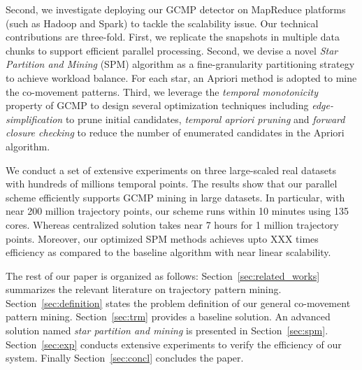 


%

Second, we investigate deploying our GCMP detector on MapReduce platforms (such as Hadoop and Spark) to tackle the scalability issue. Our technical contributions are three-fold. First, we replicate the snapshots in multiple data chunks to support efficient parallel processing. Second, we devise a novel \emph{Star Partition and Mining} (SPM) algorithm as a fine-granularity partitioning strategy to achieve workload balance. For each star, an Apriori method is adopted to mine the co-movement patterns. Third, we leverage the \emph{temporal monotonicity} property of GCMP to design several optimization techniques including \emph{edge-simplification} to prune initial candidates, \emph{temporal apriori pruning} and \emph{forward closure checking} to reduce the number of enumerated candidates in the Apriori algorithm.
%


We conduct a set of extensive experiments on three large-scaled real datasets with hundreds of millions 
temporal points. 
The results show that our parallel scheme efficiently supports GCMP mining in large datasets.
In particular, with near 200 million trajectory points, 
our scheme runs within 10 minutes using 135 cores. Whereas centralized solution takes near 7 hours for 
1 million trajectory points.
Moreover, our optimized SPM methods achieves upto XXX times efficiency
as compared to the baseline algorithm with near linear scalability.

The rest of our paper is organized as follows: Section~\ref{sec:related_works} summarizes the relevant literature on 
trajectory pattern mining. Section~\ref{sec:definition} states the problem definition of our general co-movement pattern mining. Section~\ref{sec:trm} provides a baseline solution. An advanced solution named
\emph{star partition and mining} is presented in Section~\ref{sec:spm}. Section~\ref{sec:exp} conducts extensive experiments to verify the efficiency of our system. Finally Section~\ref{sec:concl} concludes the paper.
